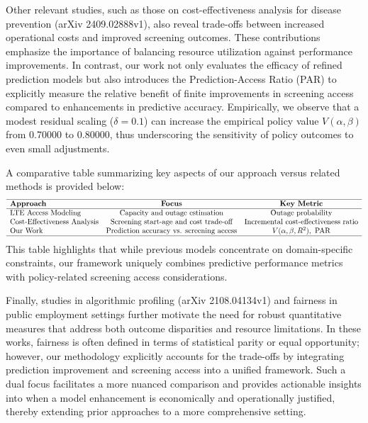 \documentclass{article}
\begin{document}
Other relevant studies, such as those on cost-effectiveness analysis for disease prevention (arXiv 2409.02888v1), also reveal trade-offs between increased operational costs and improved screening outcomes. These contributions emphasize the importance of balancing resource utilization against performance improvements. In contrast, our work not only evaluates the efficacy of refined prediction models but also introduces the Prediction-Access Ratio (PAR) to explicitly measure the relative benefit of finite improvements in screening access compared to enhancements in predictive accuracy. Empirically, we observe that a modest residual scaling (\(\delta=0.1\)) can increase the empirical policy value \( V(\alpha,\beta) \) from 0.70000 to 0.80000, thus underscoring the sensitivity of policy outcomes to even small adjustments.

A comparative table summarizing key aspects of our approach versus related methods is provided below:
\[
\begin{array}{lcc}
\hline
\textbf{Approach} & \textbf{Focus} & \textbf{Key Metric} \\
\hline
\text{LTE Access Modeling} & \text{Capacity and outage estimation} & \text{Outage probability} \\
\text{Cost-Effectiveness Analysis} & \text{Screening start-age and cost trade-off} & \text{Incremental cost-effectiveness ratio} \\
\text{Our Work} & \text{Prediction accuracy vs. screening access} & V(\alpha,\beta,R^2), \ \text{PAR} \\
\hline
\end{array}
\]
This table highlights that while previous models concentrate on domain-specific constraints, our framework uniquely combines predictive performance metrics with policy-related screening access considerations.

Finally, studies in algorithmic profiling (arXiv 2108.04134v1) and fairness in public employment settings further motivate the need for robust quantitative measures that address both outcome disparities and resource limitations. In these works, fairness is often defined in terms of statistical parity or equal opportunity; however, our methodology explicitly accounts for the trade-offs by integrating prediction improvement and screening access into a unified framework. Such a dual focus facilitates a more nuanced comparison and provides actionable insights into when a model enhancement is economically and operationally justified, thereby extending prior approaches to a more comprehensive setting.
\end{document}
